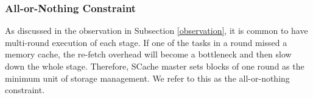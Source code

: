 \subsubsection{All-or-Nothing Constraint}
{\color{blue}
As discussed in the observation in Subsection \ref{observation}, it is common to have multi-round execution of each stage. 
If one of the tasks in a round missed a memory cache, the re-fetch overhead will become a bottleneck and then slow down the whole stage. 
}
Therefore, SCache master sets blocks of one round as the minimum unit of storage management.
We refer to this as the all-or-nothing constraint.

